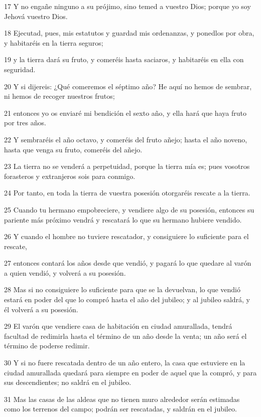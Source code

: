 \par 17 Y no engañe ninguno a su prójimo, sino temed a vuestro Dios; porque yo soy Jehová vuestro Dios.
\par 18 Ejecutad, pues, mis estatutos y guardad mis ordenanzas, y ponedlos por obra, y habitaréis en la tierra seguros;
\par 19 y la tierra dará su fruto, y comeréis hasta saciaros, y habitaréis en ella con seguridad.
\par 20 Y si dijereis: ¿Qué comeremos el séptimo año? He aquí no hemos de sembrar, ni hemos de recoger nuestros frutos;
\par 21 entonces yo os enviaré mi bendición el sexto año, y ella hará que haya fruto por tres años.
\par 22 Y sembraréis el año octavo, y comeréis del fruto añejo; hasta el año noveno, hasta que venga su fruto, comeréis del añejo.
\par 23 La tierra no se venderá a perpetuidad, porque la tierra mía es; pues vosotros forasteros y extranjeros sois para conmigo.
\par 24 Por tanto, en toda la tierra de vuestra posesión otorgaréis rescate a la tierra.
\par 25 Cuando tu hermano empobreciere, y vendiere algo de su posesión, entonces su pariente más próximo vendrá y rescatará lo que su hermano hubiere vendido.
\par 26 Y cuando el hombre no tuviere rescatador, y consiguiere lo suficiente para el rescate,
\par 27 entonces contará los años desde que vendió, y pagará lo que quedare al varón a quien vendió, y volverá a su posesión.
\par 28 Mas si no consiguiere lo suficiente para que se la devuelvan, lo que vendió estará en poder del que lo compró hasta el año del jubileo; y al jubileo saldrá, y él volverá a su posesión.
\par 29 El varón que vendiere casa de habitación en ciudad amurallada, tendrá facultad de redimirla hasta el término de un año desde la venta; un año será el término de poderse redimir.
\par 30 Y si no fuere rescatada dentro de un año entero, la casa que estuviere en la ciudad amurallada quedará para siempre en poder de aquel que la compró, y para sus descendientes; no saldrá en el jubileo.
\par 31 Mas las casas de las aldeas que no tienen muro alrededor serán estimadas como los terrenos del campo; podrán ser rescatadas, y saldrán en el jubileo.
